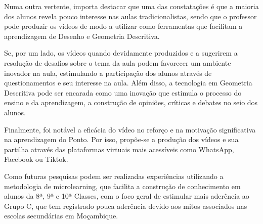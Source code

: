 \documentclass[portuguese]{textolivre}
\begin{document}
Numa outra vertente, importa destacar que uma das constatações é que a maioria dos alunos revela pouco interesse nas aulas tradicionalistas, sendo que o professor pode produzir os vídeos de modo a utilizar como ferramentas que facilitam a aprendizagem de Desenho e Geometria Descritiva.

Se, por um lado, os vídeos quando devidamente produzidos e a sugerirem a resolução de desafios sobre o tema da aula podem favorecer um ambiente inovador na aula, estimulando a participação dos alunos através de questionamentos e seu interesse na aula. Além disso, a tecnologia em Geometria Descritiva pode ser encarada como uma inovação que estimula o processo do ensino e da aprendizagem, a construção de opiniões, críticas e debates no seio dos alunos.

Finalmente, foi notável a eficácia do vídeo no reforço e na motivação significativa na aprendizagem do Ponto. Por isso, propõe-se a produção dos vídeos e sua partilha através das plataformas virtuais mais acessíveis como WhatsApp, Facebook ou Tiktok.

Como futuras pesquisas podem ser realizadas experiências utilizando a metodologia de microlearning, que facilita a construção de conhecimento em alunos da 8ª, 9ª e 10ª Classes, com o foco geral de estimular mais aderência ao Grupo C, que tem registrado pouca aderência devido aos mitos associados nas escolas secundárias em Moçambique.

\printbibliography\label{sec-bib}


\begin{dataavailability}
\end{dataavailability}
\end{document}
